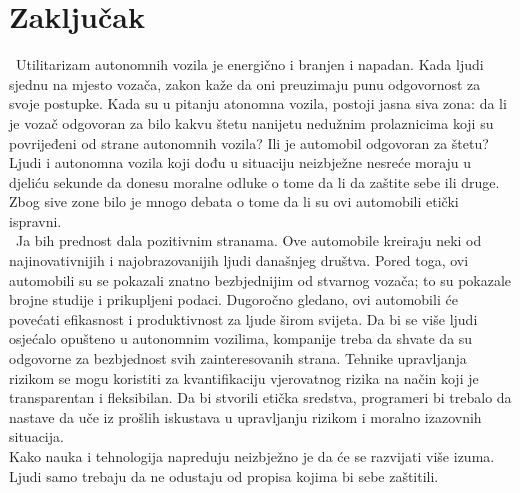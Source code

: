 \documentclass[a4paper]{article}
\begin{document}
{\section{Zaključak}
\label{sec:zaključak}
\indent~Utilitarizam autonomnih vozila je energično i branjen i napadan. Kada ljudi sjednu na mjesto vozača, zakon kaže da oni preuzimaju punu odgovornost za svoje postupke. Kada su u pitanju atonomna vozila, postoji jasna siva zona: da li je vozač odgovoran za bilo kakvu štetu nanijetu nedužnim prolaznicima koji su povrijeđeni od strane autonomnih vozila? Ili je automobil odgovoran za štetu? Ljudi i autonomna vozila koji dođu u situaciju neizbježne nesreće moraju u djeliću sekunde da donesu moralne odluke o tome da li da zaštite sebe ili druge.\\
\indent Zbog sive zone bilo je mnogo debata o tome da li su ovi automobili etički ispravni.
\vspace{0.2cm}\\
\indent~Ja bih prednost dala pozitivnim stranama. Ove automobile kreiraju neki od najinovativnijih i najobrazovanijih ljudi današnjeg društva. Pored toga, ovi automobili su se pokazali znatno bezbjednijim od stvarnog vozača; to su pokazale brojne studije i prikupljeni podaci. Dugoročno gledano, ovi automobili će povećati efikasnost i produktivnost za ljude širom svijeta. Da bi se više ljudi osjećalo opušteno u autonomnim vozilima, kompanije treba da shvate da su odgovorne za bezbjednost svih zainteresovanih strana. Tehnike upravljanja rizikom se mogu koristiti za kvantifikaciju vjerovatnog rizika na način koji je transparentan i fleksibilan. Da bi stvorili etička sredstva, programeri bi trebalo da nastave da uče iz prošlih iskustava u upravljanju rizikom i moralno izazovnih situacija.\\
\indent Kako nauka i tehnologija napreduju neizbježno je da će se razvijati više izuma. Ljudi samo trebaju da ne odustaju od propisa kojima bi sebe zaštitili. 

}
\end{document}
